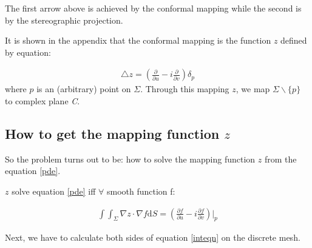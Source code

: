 \documentclass{InsightArticle}
\begin{document}
  The first arrow above is achieved by the conformal mapping while the
  second is by the stereographic projection.

  It is shown in the appendix that the conformal mapping is the
  function $z$ defined by equation:

  \begin{eqnarray}
    \triangle z = (\frac{\partial}{\partial u} -
    i\frac{\partial}{\partial v})\delta_p \label{pde}
  \end{eqnarray}
  where $p$ is an (arbitrary) point on $\Sigma$. Through this mapping
  $z$, we map $\Sigma \backslash \{ p \}$ to complex plane \emph{C}.


  \subsection{How to get the mapping function $z$}
  So the problem turns out to be: how to solve the mapping function
  $z$ from the equation \ref{pde}.

  $z$ solve equation \ref{pde} iff $\forall$ smooth function f:

  \begin{eqnarray}
    \int\int_{\Sigma}\nabla z \cdot \nabla f \textrm{d}S =
    (\frac{\partial f}{\partial u} - i\frac{\partial f}{\partial
      v})|_p \label{inteqn}
  \end{eqnarray}  

  Next, we have to calculate both sides of equation \ref{inteqn} on
  the discrete mesh.
\end{document}
